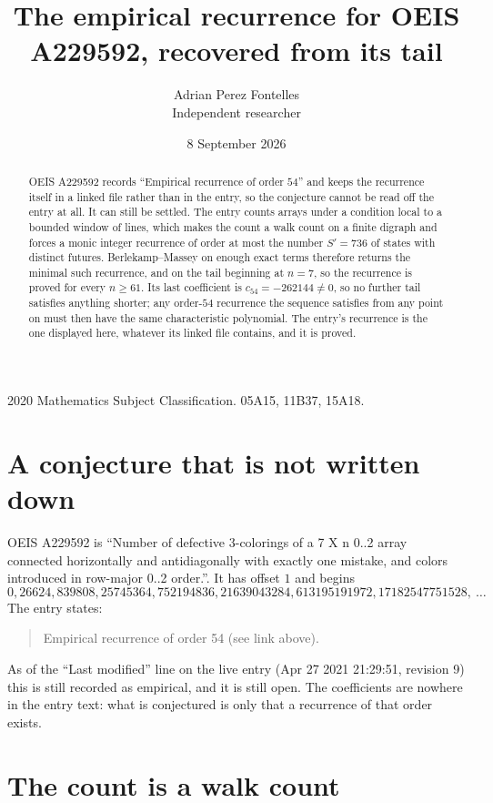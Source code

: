 \documentclass[11pt,a4paper]{article}
\title{The empirical recurrence for OEIS A229592, recovered from its tail}
\author{Adrian Perez Fontelles\\ \small Independent researcher}
\date{8 September 2026}
\theoremstyle{plain}
\theoremstyle{definition}
\begin{document}
\maketitle

\begin{abstract}
OEIS A229592 records ``Empirical recurrence of order $54$'' and keeps the recurrence itself in
a linked file rather than in the entry, so the conjecture cannot be read off the entry at all.
It can still be settled. The entry counts arrays under a condition local to a bounded window of
lines, which makes the count a walk count on a finite digraph and forces a monic integer
recurrence of order at most the number $S'=736$ of states with distinct futures. Berlekamp--Massey on
enough exact terms therefore returns the minimal such recurrence, and on the tail beginning at $n=7$, so the recurrence is proved for every $n\ge61$.
Its last coefficient is $c_{54}=-262144\neq0$, so no further tail satisfies anything
shorter; any order-$54$ recurrence the sequence satisfies from any point on must then have
the same characteristic polynomial. The entry's recurrence is the one displayed here, whatever
its linked file contains, and it is proved.
\end{abstract}

\noindent\small 2020 Mathematics Subject Classification. 05A15, 11B37, 15A18.\normalsize

\section{A conjecture that is not written down}

OEIS A229592 is ``Number of defective 3-colorings of a 7 X n 0..2 array connected horizontally and antidiagonally with exactly one mistake, and colors introduced in row-major 0..2 order.''. It has offset $1$ and begins
\[
0, 26624, 839808, 25745364, 752194836, 21639043284, 613195191972, 17182547751528,\ \dots
\]
The entry states:
\begin{quote}
Empirical recurrence of order 54 (see link above).
\end{quote}
As of the ``Last modified'' line on the live entry (Apr 27 2021 21:29:51, revision 9)
this is still recorded as empirical, and it is still open. The coefficients are nowhere in the
entry text: what is conjectured is only that a recurrence of that order exists.

\section{The count is a walk count}
\end{document}
